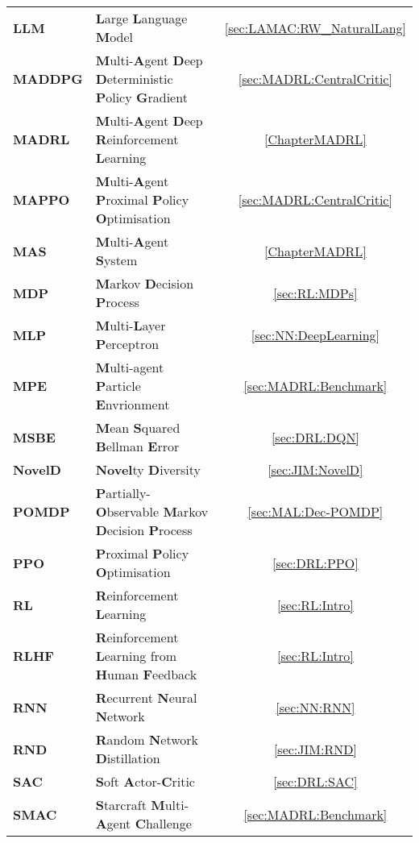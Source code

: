\documentclass[
11pt, %
english, %
singlespacing, %
parskip, %
headsepline, %
]{MastersDoctoralThesis} %
\begin{document}
\begin{abbreviations}{}
\begin{tabularx}{\textwidth}{lXc}
\textbf{LLM} & \textbf{L}arge \textbf{L}anguage \textbf{M}odel & \ref{sec:LAMAC:RW_NaturalLang} \\
\textbf{MADDPG} & \textbf{M}ulti-\textbf{A}gent \textbf{D}eep \textbf{D}eterministic \textbf{P}olicy \textbf{G}radient & \ref{sec:MADRL:CentralCritic} \\
\textbf{MADRL} & \textbf{M}ulti-\textbf{A}gent \textbf{D}eep \textbf{R}einforcement \textbf{L}earning & \ref{ChapterMADRL} \\
\textbf{MAPPO} & \textbf{M}ulti-\textbf{A}gent \textbf{P}roximal \textbf{P}olicy \textbf{O}ptimisation & \ref{sec:MADRL:CentralCritic} \\
\textbf{MAS} & \textbf{M}ulti-\textbf{A}gent \textbf{S}ystem & \ref{ChapterMADRL} \\
\textbf{MDP} & \textbf{M}arkov \textbf{D}ecision \textbf{P}rocess & \ref{sec:RL:MDPs} \\
\textbf{MLP} & \textbf{M}ulti-\textbf{L}ayer \textbf{P}erceptron & \ref{sec:NN:DeepLearning} \\
\textbf{MPE} & \textbf{M}ulti-agent \textbf{P}article \textbf{E}nvrionment & \ref{sec:MADRL:Benchmark} \\
\textbf{MSBE} & \textbf{M}ean \textbf{S}quared \textbf{B}ellman \textbf{E}rror & \ref{sec:DRL:DQN} \\
\textbf{NovelD} & \textbf{Novel}ty \textbf{D}iversity & \ref{sec:JIM:NovelD} \\
\textbf{POMDP} & \textbf{P}artially-\textbf{O}bservable \textbf{M}arkov \textbf{D}ecision \textbf{P}rocess & \ref{sec:MAL:Dec-POMDP} \\
\textbf{PPO} & \textbf{P}roximal \textbf{P}olicy \textbf{O}ptimisation & \ref{sec:DRL:PPO} \\
\textbf{RL} & \textbf{R}einforcement \textbf{L}earning & \ref{sec:RL:Intro} \\
\textbf{RLHF} & \textbf{R}einforcement \textbf{L}earning from \textbf{H}uman \textbf{F}eedback & \ref{sec:RL:Intro} \\
\textbf{RNN} & \textbf{R}ecurrent \textbf{N}eural \textbf{N}etwork & \ref{sec:NN:RNN} \\
\textbf{RND} & \textbf{R}andom \textbf{N}etwork \textbf{D}istillation & \ref{sec:JIM:RND} \\
\textbf{SAC} & \textbf{S}oft \textbf{A}ctor-\textbf{C}ritic & \ref{sec:DRL:SAC} \\
\textbf{SMAC} & \textbf{S}tarcraft \textbf{M}ulti-\textbf{A}gent \textbf{C}hallenge & \ref{sec:MADRL:Benchmark} \\

\end{tabularx}
\end{abbreviations}
\end{document}
